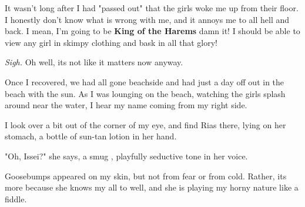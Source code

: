 \documentclass{article}
\begin{document}
It wasn't long after I had "passed out" that the girls woke me up from their floor. I honestly don't know what is wrong with me, and it annoys me to all hell and back. I mean, I'm going to be \textbf{King of the Harems} damn it! I should be able to view any girl in skimpy clothing and bask in all that glory!

\emph{Sigh.} Oh well, its not like it matters now anyway.

Once I recovered, we had all gone beachside and had just a day off out in the beach with the sun. As I was lounging on the beach, watching the girls splash around near the water, I hear my name coming from my right side.

I look over a bit out of the corner of my eye, and find Rias there, lying on her stomach, a bottle of sun-tan lotion in her hand.

"Oh, Issei?" she says, a smug , playfully seductive tone in her voice.

Goosebumps appeared on my skin, but not from fear or from cold. Rather, its more because she knows my all to well, and she is playing my horny nature like a fiddle.
\end{document}
